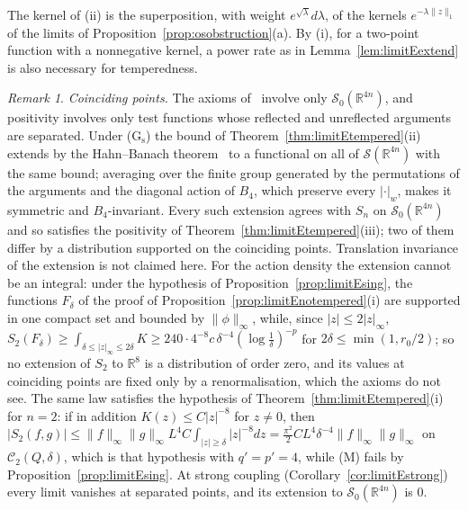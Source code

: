 \documentclass[aps,prd,twocolumn,superscriptaddress,nofootinbib,longbibliography,floatfix,amsmath,amssymb,10pt]{revtex4-2}
\theoremstyle{definition}
\theoremstyle{remark}
\newtheorem{remark}[theorem]{Remark}
\newcommand{\R}{\mathbb{R}}
\begin{document}
The kernel of (ii) is the superposition, with weight $e^{\sqrt\lambda}d
\lambda$, of the kernels $e^{-\lambda\|z\|_1}$ of the limits of
Proposition~\ref{prop:osobstruction}(a). By (i), for a two-point function
with a nonnegative kernel, a power rate as in
Lemma~\ref{lem:limitEextend} is also necessary for temperedness.

\begin{remark}\label{rem:limitEcontact}
\emph{Coinciding points.} The axioms of~\cite{OS73,OS75} involve only
$\mathcal S_0(\R^{4n})$, and positivity involves only test functions whose
reflected and unreflected arguments are separated. Under (G$_{\mathrm s}$)
the bound of Theorem~\ref{thm:limitEtempered}(ii) extends by the Hahn--Banach
theorem~\cite{RS80} to a functional on all of $\mathcal S(\R^{4n})$ with the
same bound; averaging over the finite group generated by the permutations of
the arguments and the diagonal action of $B_4$, which preserve every
$|\cdot|_w$, makes it symmetric and $B_4$-invariant. Every such extension
agrees with $S_n$ on $\mathcal S_0(\R^{4n})$ and so satisfies the positivity
of Theorem~\ref{thm:limitEtempered}(iii); two of them differ by a distribution
supported on the coinciding points. Translation invariance of the extension
is not claimed here. For the action density the extension cannot be an
integral: under the hypothesis of Proposition~\ref{prop:limitEsing}, the
functions $F_\delta$ of the proof of
Proposition~\ref{prop:limitEnotempered}(i) are supported in one compact set
and bounded by $\|\phi\|_\infty$, while, since $|z|\le2|z|_\infty$,
$S_2(F_\delta)\ge\int_{\delta\le|z|_\infty\le2\delta}K\ge240\cdot4^{-8}c\,
\delta^{-4}(\log\frac1\delta)^{-p}$ for $2\delta\le\min(1,r_0/2)$; so no
extension of $S_2$ to $\R^8$ is a distribution of order zero, and its values
at coinciding points are fixed only by a renormalisation, which the axioms do
not see. The same law satisfies the hypothesis of
Theorem~\ref{thm:limitEtempered}(i) for $n=2$: if in addition $K(z)\le
C|z|^{-8}$ for $z\ne0$, then $|S_2(f,g)|\le\|f\|_\infty\|g\|_\infty L^4C\int_{
|z|\ge\delta}|z|^{-8}dz=\frac{\pi^2}2CL^4\delta^{-4}\|f\|_\infty\|g\|_\infty$ on
$\mathcal C_2(Q,\delta)$, which is that hypothesis with $q'=p'=4$, while (M)
fails by Proposition~\ref{prop:limitEsing}. At strong coupling
(Corollary~\ref{cor:limitEstrong}) every limit vanishes at separated points,
and its extension to $\mathcal S_0(\R^{4n})$ is $0$.
\end{remark}
\end{document}
